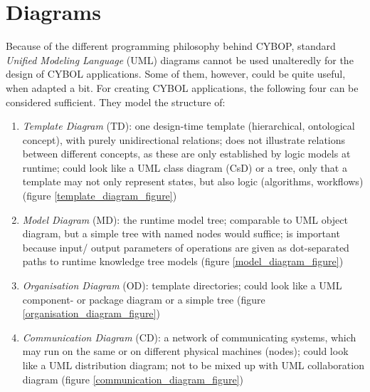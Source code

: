 %
%
%
%
%
%

\chapter{Diagrams}
\label{diagrams_heading}

Because of the different programming philosophy behind CYBOP, standard
\emph{Unified Modeling Language} (UML) diagrams cannot be used unalteredly for
the design of CYBOL applications. Some of them, however, could be quite useful,
when adapted a bit. For creating CYBOL applications, the following four can be
considered sufficient. They model the structure of:

\begin{enumerate}
    \item \emph{Template Diagram} (TD): one design-time template (hierarchical,
        ontological concept), with purely unidirectional relations; does not
        illustrate relations between different concepts, as these are only
        established by logic models at runtime; could look like a UML class
        diagram (CsD) or a tree, only that a template may not only represent states,
        but also logic (algorithms, workflows) (figure \ref{template_diagram_figure})
    \item \emph{Model Diagram} (MD): the runtime model tree; comparable to UML
        object diagram, but a simple tree with named nodes would suffice; is
        important because input/ output parameters of operations are given as
        dot-separated paths to runtime knowledge tree models (figure \ref{model_diagram_figure})
    \item \emph{Organisation Diagram} (OD): template directories; could look
        like a UML component- or package diagram or a simple tree (figure \ref{organisation_diagram_figure})
    \item \emph{Communication Diagram} (CD): a network of communicating
        systems, which may run on the same or on different physical machines
        (nodes); could look like a UML distribution diagram; not to be mixed
        up with UML collaboration diagram (figure \ref{communication_diagram_figure})
\end{enumerate}

